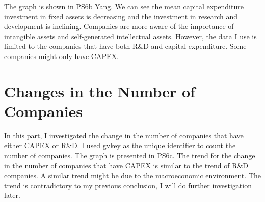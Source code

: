 \documentclass{article}
\begin{document}
The graph is shown in PS6b Yang. We can see the mean capital expenditure investment in fixed assets is decreasing and the investment in research and development is inclining. Companies are more aware of the importance of intangible assets and self-generated intellectual assets. However, the data I use is limited to the companies that have both R&D and capital expenditure. Some companies might only have CAPEX.

\section{Changes in the Number of Companies}
In this part, I investigated the change in the number of companies that have either CAPEX or R&D. I used gvkey as the unique identifier to count the number of companies. The graph is presented in PS6c. The trend for the change in the number of companies that have CAPEX is similar to the trend of R&D companies. A similar trend might be due to the macroeconomic environment. The trend is contradictory to my previous conclusion, I will do further investigation later.
\end{document}
